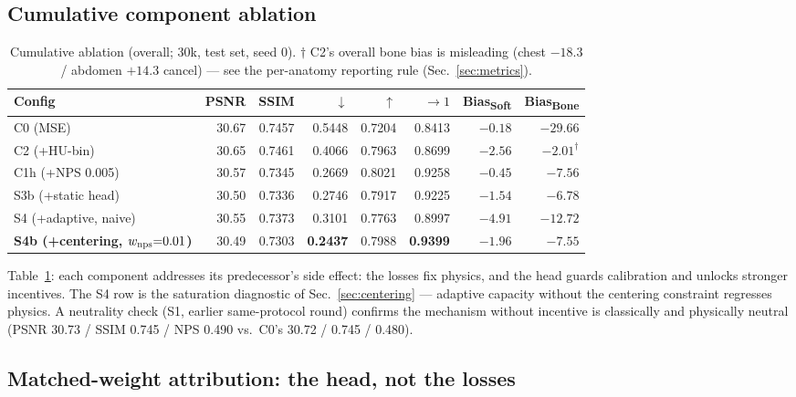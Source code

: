 \subsection{Cumulative component ablation}
\label{sec:ablation}

\begin{table}[!tp]
\centering
\caption{Cumulative ablation (overall; 30k, test set, seed 0). $\dagger$ C2's overall bone bias is misleading (chest $-18.3$ / abdomen $+14.3$ cancel) --- see the per-anatomy reporting rule (Sec.~\ref{sec:metrics}).}
\label{tab:ablation}
\small
\begin{tabular}{lrrrrrrr}
\toprule
Config & PSNR & SSIM & \npsl{} $\downarrow$ & \npsc{} $\uparrow$ & \stdr{} $\rightarrow 1$ & Bias\textsubscript{Soft} & Bias\textsubscript{Bone} \\
\midrule
C0 (MSE) & 30.67 & 0.7457 & 0.5448 & 0.7204 & 0.8413 & $-0.18$ & $-29.66$ \\
C2 (+HU-bin) & 30.65 & 0.7461 & 0.4066 & 0.7963 & 0.8699 & $-2.56$ & $-2.01^{\dagger}$ \\
C1h (+NPS 0.005) & 30.57 & 0.7345 & 0.2669 & 0.8021 & 0.9258 & $-0.45$ & $-7.56$ \\
S3b (+static head) & 30.50 & 0.7336 & 0.2746 & 0.7917 & 0.9225 & $-1.54$ & $-6.78$ \\
S4 (+adaptive, naive) & 30.55 & 0.7373 & 0.3101 & 0.7763 & 0.8997 & $-4.91$ & $-12.72$ \\
\textbf{S4b (+centering, $w_{\mathrm{nps}}{=}0.01$)} & 30.49 & 0.7303 & \textbf{0.2437} & 0.7988 & \textbf{0.9399} & $-1.96$ & $-7.55$ \\
\bottomrule
\end{tabular}
\end{table}

Table~\ref{tab:ablation}: each component addresses its predecessor's side effect: the losses fix physics, and the head guards calibration and unlocks stronger incentives. The S4 row is the saturation diagnostic of Sec.~\ref{sec:centering} --- adaptive capacity without the centering constraint regresses physics. A neutrality check (S1, earlier same-protocol round) confirms the mechanism without incentive is classically and physically neutral (PSNR 30.73 / SSIM 0.745 / NPS 0.490 vs.\ C0's 30.72 / 0.745 / 0.480).

\subsection{Matched-weight attribution: the head, not the losses}
\label{sec:attribution}

